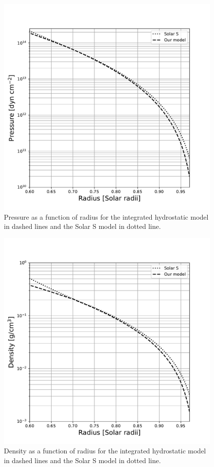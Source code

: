 \begin{figure}[htbp]
    \centering
    \includegraphics[width=0.8\linewidth]{./solar_vs_model_plots/Pressure.pdf} %
    \caption{Pressure as a function of radius for the integrated hydrostatic model in dashed lines and the Solar S model in dotted line.}
    \label{fig:pressure} %
\end{figure}

\begin{figure}[htbp]
    \centering
    \includegraphics[width=0.8\linewidth]{./solar_vs_model_plots/Density.pdf} %
    \caption{Density as a function of radius for the integrated hydrostatic model in dashed lines and the Solar S model in dotted line.}
    \label{fig:density} %
\end{figure}

